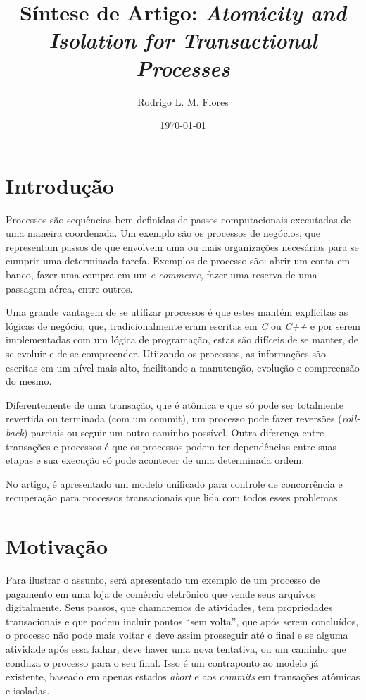 \documentclass[a4paper,12pt,notitlepage]{article}
\title{Síntese de Artigo: \textit{Atomicity and Isolation for Transactional Processes}}
\author{Rodrigo L. M. Flores}
\date{\today}
\begin{document}
\maketitle

\nocite{alonso}


\section{Introdução}

Processos são sequências bem definidas de passos computacionais executadas de uma maneira coordenada. Um exemplo são os processos de negócios, que representam passos de que envolvem uma ou mais organizações necesárias para se cumprir uma determinada tarefa. Exemplos de processo são: abrir um conta em banco, fazer uma compra em um \textit{e-commerce}, fazer uma reserva de uma passagem aérea, entre outros. 

Uma grande vantagem de se utilizar processos é que estes mantém explícitas as lógicas de negócio, que, tradicionalmente eram escritas em \textit{C} ou \textit{C++}  e por serem implementadas com um lógica de programação, estas são difíceis de se manter, de se evoluir e de se compreender. Utiizando os processos, as informações são escritas em um nível mais alto, facilitando a manutenção, evolução e compreensão do mesmo. 

Diferentemente de uma transação, que é atômica e que só pode ser totalmente revertida ou terminada (com um commit),  um processo pode fazer reversões (\textit{roll-back}) parciais ou seguir um outro caminho possível. Outra diferença entre transações e processos é que os processos podem ter dependências entre suas etapas e sua execução só pode acontecer de uma determinada ordem. 

No artigo, é apresentado um modelo unificado para controle de concorrência e recuperação para processos transacionais que lida com todos esses problemas.

\newpage

\section{Motivação}

Para ilustrar o assunto, será apresentado um exemplo de um processo de pagamento em uma loja de comércio eletrônico que vende seus arquivos digitalmente. Seus passos, que chamaremos de atividades, tem propriedades transacionais e que podem incluir pontos ``sem volta'', que após serem concluídos, o processo não pode mais voltar e deve assim prosseguir até o final e se alguma atividade após essa falhar, deve haver uma nova tentativa, ou um caminho que conduza o processo para o seu final. Isso é um contraponto ao modelo já existente, baseado em apenas estados \textit{abort} e aos \textit{commits} em transações atômicas e isoladas. 
\end{document}
